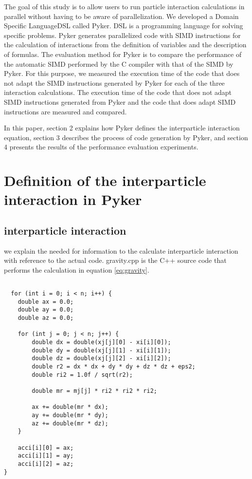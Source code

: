 \documentclass[ams]{article}
\begin{document}
The goal of this study is to allow users to run particle interaction 
calculations in parallel without having to be aware of parallelization.
We developed a Domain Specific Language\lparen DSL \rparen called Pyker.
DSL is a programming language for solving specific problems.
Pyker generates parallelized code with SIMD instructions for the 
calculation of interactions from the definition of variables and 
the description of formulas.
The evaluation method for Pyker is to compare the performance of 
the automatic SIMD  performed by the C compiler with that of the 
SIMD by Pyker. 
For this purpose, we measured the execution time of the code that
does not adapt the SIMD instructions generated by Pyker for each 
of the three interaction calculations.
The execution time of the code that does not adapt SIMD instructions
generated from Pyker and the code that does adapt SIMD instructions 
are measured and compared.

In this paper, section 2 explains how Pyker defines the interparticle 
interaction equation, section 3 describes the process of code generation 
by Pyker, and section 4 presents the results of the performance evaluation
experiments.

\section{Definition of the interparticle interaction in Pyker}

\subsection{interparticle interaction}
we explain the needed for information to the calculate interparticle 
interaction with reference to the actual code.
gravity.cpp is the C++ source code that performs the calculation 
in equation \eqref{eq:gravity}.
\begin{lstlisting}[frame=single, caption=skeleton code, label=fuga]
                  
  for (int i = 0; i < n; i++) {
    double ax = 0.0;
    double ay = 0.0;
    double az = 0.0;

    for (int j = 0; j < n; j++) {
        double dx = double(xj[j][0] - xi[i][0]);
        double dy = double(xj[j][1] - xi[i][1]);
        double dz = double(xj[j][2] - xi[i][2]);
        double r2 = dx * dx + dy * dy + dz * dz + eps2;
        double ri2 = 1.0f / sqrt(r2); 
        
        double mr = mj[j] * ri2 * ri2 * ri2;

        ax += double(mr * dx);
        ay += double(mr * dy);
        az += double(mr * dz);
    }

    acci[i][0] = ax;
    acci[i][1] = ay;
    acci[i][2] = az;
}
\end{lstlisting}
\end{document}
